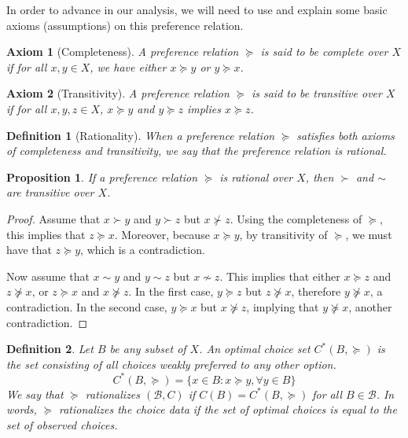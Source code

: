 \documentclass[12pt]{report}
\newtheorem{definition}{Definition}[chapter]
\newtheorem{proposition}{Proposition}[chapter]
\newtheorem{axiom}{Axiom}[chapter]
\begin{document}
In order to advance in our analysis, we will need to use and explain some basic axioms (assumptions) on this preference relation.

\begin{axiom}[Completeness]
A preference relation $\succeq$ is said to be complete over $X$ if for all $x,y\in X$, we have either $x\succeq y$ or $y \succeq x$.
\end{axiom}

\begin{axiom}[Transitivity]
A preference relation $\succeq$ is said to be transitive over $X$ if for all $x,y,z\in X$, $x\succeq y$ and $y \succeq z$ implies $x\succeq z$.
\end{axiom}

\begin{definition}[Rationality]
When a preference relation $\succeq$ satisfies both axioms of completeness and transitivity, we say that the preference relation is rational.
\end{definition}

\begin{proposition}
If a preference relation $\succeq$ is rational over $X$, then $\succ$ and $\sim$ are transitive over $X$.
\end{proposition}

\begin{proof}
Assume that $x\succ y$ and $y\succ z$ but $x\not\succ z$. Using the completeness of $\succeq$, this implies that $z\succeq x$. Moreover, because $x\succeq y$, by transitivity of $\succeq$, we must have that $z\succeq y$, which is a contradiction.

Now assume that $x\sim y$ and $y\sim z$ but $x\not\sim z$. This implies that either $x\succeq z$ and $z \not\succeq x$, or $z\succeq x$ and $x\not\succeq z$. In the first case, $y\succeq z$ but $z \not\succeq x$, therefore $y\not\succeq x$, a contradiction. In the second case, $y \succeq x$ but $x\not\succeq z$, implying that $y\not\succeq x$, another contradiction.
\end{proof}

\begin{definition}
Let $B$ be any subset of $X$. An optimal choice set $C^*(B, \succeq)$ is the set consisting of all choices weakly preferred to any other option. $$C^*(B, \succeq) = \{x\in B: x\succeq y, \forall y\in B\}$$ We say that $\succeq$ rationalizes $(\mathcal{B},C)$ if $C(B) = C^*(B,\succeq)$ for all $B\in\mathcal{B}$. In words, $\succeq$ rationalizes the choice data if the set of optimal choices is equal to the set of observed choices.
\end{definition}
\end{document}
